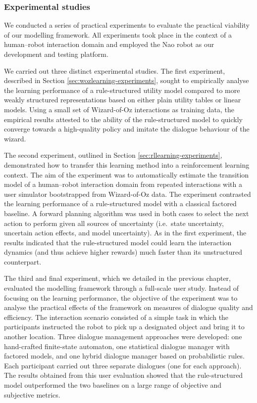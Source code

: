 \subsubsection*{Experimental studies}

We conducted a series of practical experiments to evaluate the practical viability of our modelling framework. All experiments took place in the context of a human--robot interaction domain and employed the Nao robot as our development and testing platform. 

We carried out three distinct experimental studies.  The first experiment, described in Section \ref{sec:wozlearning-experiments}, sought to empirically analyse the learning performance of a rule-structured utility model compared to more weakly structured representations based on either plain utility tables or linear models.  Using a small set of Wizard-of-Oz interactions as training data, the empirical results attested to the ability of the rule-structured model to quickly converge towards a high-quality policy and imitate the dialogue behaviour of the wizard.

The second experiment, outlined in Section \ref{sec:rllearning-experiments}, demonstrated how to transfer this learning method into a reinforcement learning context.  The aim of the experiment was to automatically estimate the transition model of a human--robot interaction domain from repeated interactions with a user simulator bootstrapped from Wizard-of-Oz data. The experiment contrasted the learning performance of a rule-structured model with a classical factored baseline.  A forward planning algorithm was used in both cases to select the next action to perform given all sources of uncertainty (i.e.\ state uncertainty, uncertain action effects, and model uncertainty). As in the first experiment, the results indicated that the rule-structured model could learn the interaction dynamics (and thus achieve higher rewards) much faster than its unstructured counterpart.

The third and final experiment, which we detailed in the previous chapter, evaluated the modelling framework through a full-scale user study.   Instead of focusing on the learning performance, the objective of the experiment was to analyse the practical effects of the framework on measures of dialogue quality and efficiency. The interaction scenario consisted of a simple task in which the participants instructed the robot to pick up a designated object and bring it to another location. Three dialogue management approaches were developed: one hand-crafted finite-state automaton, one statistical dialogue manager with factored models, and one hybrid dialogue manager based on probabilistic rules.  Each participant carried out three separate dialogues (one for each approach).  The results obtained from this user evaluation showed that the rule-structured model outperformed the two baselines on a large range of objective and subjective metrics.

